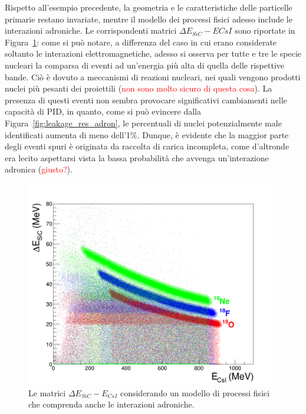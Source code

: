Rispetto all'esempio precedente, la geometria e le caratteristiche delle particelle primarie restano invariate, mentre il modello dei processi fisici adesso include le interazioni adroniche. 
Le corrispondenti matrici $\Delta E_{SiC} - E{CsI}$ sono riportate in Figura~\ref{fig:deltaE_ERes_adron}: come si può notare, a differenza del caso in cui erano considerate soltanto le interazioni elettromagnetiche, adesso si osserva per tutte e tre le specie nucleari la comparsa di eventi ad un'energia più alta di quella delle rispettive bande.
Ciò è dovuto a meccanismi di reazioni nucleari, nei quali vengono prodotti nuclei più pesanti dei proiettili (\textcolor{red}{non sono molto sicuro di questa cosa}).
La presenza di questi eventi non sembra provocare significativi cambiamenti nelle capacità di PID, in quanto, come si può evincere dalla Figura~\ref{fig:leakage_res_adron}, le percentuali di nuclei potenzialmente male identificati aumenta di meno dell'1\%. 
Dunque, è evidente che la maggior parte degli eventi spuri è originata da raccolta di carica incompleta, come d'altronde era lecito aspettarsi vista la bassa probabilità che avvenga un'interazione adronica (\textcolor{red}{giusto?}).



\begin{figure} [!t]
	\centering
	\includegraphics[width=\textwidth, keepaspectratio]{Grafici_Tesi/Interazioni_adroniche/deltaE_ERes.png}
	\caption{Le matrici $\Delta E_{SiC} - E_{CsI}$ considerando un modello di processi fisici che comprenda anche le interazioni adroniche.} \label{fig:deltaE_ERes_adron}
\end{figure}



